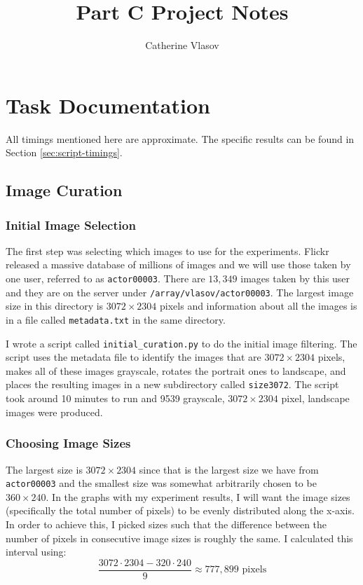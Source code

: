 \documentclass[11pt,a4paper]{report}
\begin{document}
\title{Part C Project Notes}
\author{Catherine Vlasov}
\maketitle

\tableofcontents


\chapter{Task Documentation}

All timings mentioned here are approximate. The specific results can be found in Section \ref{sec:script-timings}.

\section{Image Curation}

\subsection{Initial Image Selection}
\label{subsec:initial-image-selection}

The first step was selecting which images to use for the experiments. Flickr released a massive database of millions of images and we will use those taken by one user, referred to as \texttt{actor00003}. There are $13,349$ images taken by this user and they are on the server under \texttt{/array/vlasov/actor00003}. The largest image size in this directory is $3072\times2304$ pixels and information about all the images is in a file called \texttt{metadata.txt} in the same directory.

I wrote a script called \texttt{initial\_curation.py} to do the initial image filtering. The script uses the metadata file to identify the images that are $3072\times2304$ pixels, makes all of these images grayscale, rotates the portrait ones to landscape, and places the resulting images in a new subdirectory called \texttt{size3072}. The script took around 10 minutes to run and 9539 grayscale, $3072\times2304$ pixel, landscape images were produced.


\subsection{Choosing Image Sizes}
\label{subsec:image-sizes}

The largest size is $3072\times2304$ since that is the largest size we have from \texttt{actor00003} and the smallest size was somewhat arbitrarily chosen to be $360\times240$. In the graphs with my experiment results, I will want the image sizes (specifically the total number of pixels) to be evenly distributed along the x-axis. In order to achieve this, I picked sizes such that the difference between the number of pixels in consecutive image sizes is roughly the same. I calculated this interval using:
\begin{equation*}
\frac{3072 \cdot 2304 - 320 \cdot 240}{9} \approx 777,899 \text{ pixels}
\end{equation*}
\end{document}
